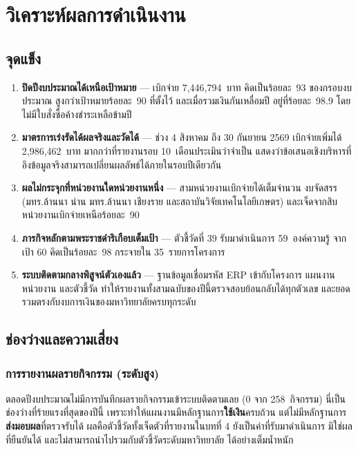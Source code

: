 \chapter{วิเคราะห์ผลการดำเนินงาน}

\section{จุดแข็ง}
\begin{enumerate}[leftmargin=1.6em,itemsep=3pt]
  \item \textbf{ปิดปีงบประมาณได้เหนือเป้าหมาย} --- เบิกจ่าย 7,446,794~บาท คิดเป็นร้อยละ~93
        ของกรอบงบประมาณ สูงกว่าเป้าหมายร้อยละ~90 ที่ตั้งไว้ และเมื่อรวมเงินกันเหลื่อมปี
        อยู่ที่ร้อยละ~98.9 โดยไม่มีใบสั่งซื้อค้างชำระเหลือข้ามปี
  \item \textbf{มาตรการเร่งรัดได้ผลจริงและวัดได้} --- ช่วง 4 สิงหาคม ถึง 30 กันยายน 2569
        เบิกจ่ายเพิ่มได้ 2,986,462~บาท มากกว่าที่รายงานรอบ 10~เดือนประเมินว่าจำเป็น
        แสดงว่าข้อเสนอเชิงบริหารที่อิงข้อมูลจริงสามารถเปลี่ยนผลลัพธ์ได้ภายในรอบปีเดียวกัน
  \item \textbf{ผลไม่กระจุกที่หน่วยงานใดหน่วยงานหนึ่ง} --- สามหน่วยงานเบิกจ่ายได้เต็มจำนวน
        งบจัดสรร (มทร.ล้านนา น่าน มทร.ล้านนา เชียงราย และสถาบันวิจัยเทคโนโลยีเกษตร)
        และเจ็ดจากสิบหน่วยงานเบิกจ่ายเหนือร้อยละ~90
  \item \textbf{ภารกิจหลักตามพระราชดำริเกือบเต็มเป้า} --- ตัวชี้วัดที่ 39 รับมาดำเนินการ
        59~องค์ความรู้ จากเป้า 60 คิดเป็นร้อยละ~98 กระจายใน 35~รายการโครงการ
  \item \textbf{ระบบติดตามกลางพิสูจน์ตัวเองแล้ว} --- ฐานข้อมูลเชื่อมรหัส ERP เข้ากับโครงการ
        แผนงาน หน่วยงาน และตัวชี้วัด ทำให้รายงานทั้งสามฉบับของปีนี้ตรวจสอบย้อนกลับได้ทุกตัวเลข
        และยอดรวมตรงกับงบการเงินของมหาวิทยาลัยครบทุกระดับ
\end{enumerate}

\section{ช่องว่างและความเสี่ยง}

\subsection{การรายงานผลรายกิจกรรม (ระดับสูง)}
ตลอดปีงบประมาณไม่มีการบันทึกผลรายกิจกรรมเข้าระบบติดตามเลย (0 จาก 258~กิจกรรม)
นี่เป็นช่องว่างที่ร้ายแรงที่สุดของปีนี้ เพราะทำให้แผนงานมีหลักฐานการ\textbf{ใช้เงิน}ครบถ้วน
แต่ไม่มีหลักฐานการ\textbf{ส่งมอบผล}ที่ตรวจรับได้ ผลคือตัวชี้วัดทั้งเจ็ดตัวที่รายงานในบทที่ 4
ยังเป็นค่าที่รับมาดำเนินการ มิใช่ผลที่ยืนยันได้ และไม่สามารถนำไปรวมกับตัวชี้วัดระดับมหาวิทยาลัย
ได้อย่างเต็มน้ำหนัก

